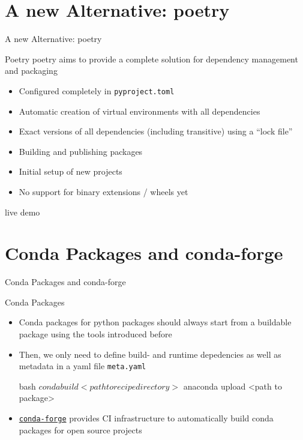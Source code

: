 \documentclass[
  aspectratio=1610,
]{beamer}
\newcommand\headlineframe[1]{%
  \begin{frame}[c]%
    \begin{center}%
      \Huge\color{vertexDarkRed}#1%
    \end{center}%
  \end{frame}%
}%
\begin{document}
\section{A new Alternative: poetry}
\headlineframe{A new Alternative: poetry}
\begin{frame}[c]{Poetry}
  poetry aims to provide a complete solution for dependency management and packaging

  \begin{itemize}
    \item[\color{positive}\faPlus] Configured completely in \texttt{pyproject.toml}
    \item[\color{positive}\faPlus] Automatic creation of virtual environments with all dependencies
    \item[\color{positive}\faPlus] Exact versions of all dependencies (including transitive) using a \enquote{lock file}
    \item[\color{positive}\faPlus] Building and publishing packages
    \item[\color{positive}\faPlus] Initial setup of new projects
    \item[\color{negative}\faMinus] No support for binary extensions / wheels yet
  \end{itemize}
\end{frame}

\headlineframe{live demo}

\section{Conda Packages and conda-forge}
\headlineframe{Conda Packages and conda-forge}

\begin{frame}[c, fragile]{Conda Packages}
  \begin{itemize}
    \item Conda packages for python packages should always start from a buildable package using the tools introduced before
    \item Then, we only need to define build- and runtime depedencies as well as metadata in a yaml file \texttt{meta.yaml}
      \begin{code}{bash}
        $ conda build <path to recipe directory>
        $ anaconda upload <path to package>
      \end{code}
    \item \href{https://conda-forge.org/}{\texttt{conda-forge}} provides CI infrastructure to automatically build conda packages for open source projects
  \end{itemize}
\end{frame}
\end{document}
